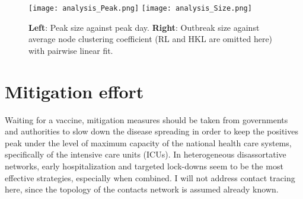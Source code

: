 \documentclass[DIV=12, BCOR=0pt]{scrartcl}  %
\begin{document}
	\begin{figure}[h]
		\centering
		\texttt{[image: analysis\_Peak.png]}
		\texttt{[image: analysis\_Size.png]}
		\caption{\textbf{Left}: Peak size against peak day. %
			\textbf{Right}: Outbreak size against average node clustering coefficient (RL and HKL are omitted here) with pairwise linear fit.}
		\label{fig:analysis}
	\end{figure}
  

	\section{Mitigation effort}
	\label{sec:miti}
	

	Waiting for a vaccine, mitigation measures should be taken from governments and authorities to slow down the disease spreading in order to keep the positives peak under the level of maximum capacity of the national health care systems, specifically of the intensive care units (ICUs). 
	In heterogeneous disassortative networks, early hospitalization and targeted lock-downs seem to be the most effective strategies, especially when combined. I will not address contact tracing here, since the topology of the contacts network is assumed already known. 
	
\end{document}
